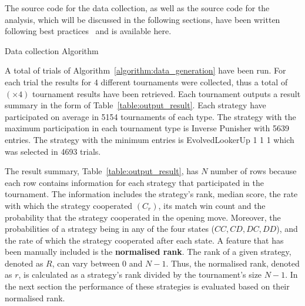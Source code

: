 \documentclass{article}
\newcommand{\uniquenumberofseeds}{}
\newcommand{\numberofalltournaments}{}
\begin{document}
The source code for the data collection, as well as the source code for
the analysis, which will be discussed in the following sections, have been written
following best practices~\cite{Aberdour2007, Benureau2018}
and is available here. %

\begin{algorithm}[!htbp]
    \;
    \caption{Data collection Algorithm}
    \label{algorithm:data_generation}
\end{algorithm}

A total of \uniquenumberofseeds trials of Algorithm~\ref{algorithm:data_generation} have been
run. For each trial the results for 4 different tournaments were collected,
thus a total of \numberofalltournaments $(\uniquenumberofseeds \times 4)$ tournament results have been
retrieved. Each tournament outputs a result summary in the form of
Table~\ref{table:output_result}. Each strategy have participated on average in
5154 tournaments of each type. The strategy with the maximum participation in each
tournament type is Inverse Punisher with 5639 entries. The strategy with the
minimum entries is EvolvedLookerUp 1 1 1 which was selected in 4693 trials.

The result summary, Table~\ref{table:output_result}, has \(N\) number of rows
because each row contains information for each strategy that participated in the
tournament. The information includes the strategy's rank, median score, the rate
with which the strategy cooperated $(C_r)$, its match win count and the
probability that the strategy cooperated in the opening move. Moreover, the
probabilities of a strategy being in any of the four states ($CC, CD, DC, DD$),
and the rate of which the strategy cooperated after each state. A feature that
has been manually included is the \textbf{normalised rank}. The rank of a given
strategy, denoted as \(R\), can vary between 0 and \(N-1\). Thus, the normalised rank,
denoted as $r$, is calculated as a strategy's rank divided by the tournament's
size \(N - 1\). In the next section the performance of these strategies is evaluated
based on their normalised rank.
\end{document}

